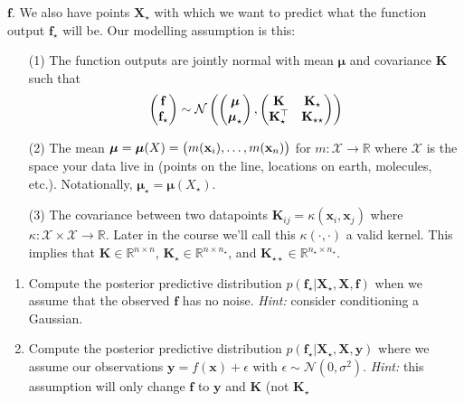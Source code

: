 \documentclass[letter, 12pt]{article}
\begin{document}
\begin{enumerate}
    $\mathbf{f}$. We also have points $\mathbf{X}_\star$ with which we want to predict
    what the function output $\mathbf{f}_\star$ will be. Our modelling assumption is this:
    \begin{enumerate}
        \item[(1)] The function outputs are jointly normal with mean $\boldsymbol{\mu}$ and
            covariance $\mathbf{K}$ such that
            \[
                \left(\begin{matrix}\mathbf{f}\\\mathbf{f}_\star\end{matrix}\right) \sim \mathcal{N}\left(\left(\begin{matrix}\boldsymbol{\mu}\\\boldsymbol{\mu}_\star\end{matrix}\right),\left(\begin{matrix}\mathbf{K}&\mathbf{K}_\star\\\mathbf{K}_\star^\top&\mathbf{K}_{\star\star}\end{matrix}\right)\right)
            \]
        \item[(2)] The mean $\boldsymbol{\mu} = \boldsymbol{\mu}(X) =
            \left(\begin{matrix}m(\mathbf{x}_i),\dots,m(\mathbf{x}_n)\end{matrix}\right)$ for $m : \mathcal{X} \rightarrow
            \mathbb{R}$ where $\mathcal{X}$ is the space your data live in (points on
            the line, locations on earth, molecules, etc.). Notationally,
            $\boldsymbol{\mu}_\star = \boldsymbol{\mu}(X_\star)$.
        \item[(3)] The covariance between two datapoints $\mathbf{K}_{ij} =
            \kappa(\mathbf{x}_i,\mathbf{x}_j)$ where $\kappa : \mathcal{X}\times
            \mathcal{X}\rightarrow \mathbb{R}$. Later in the course we'll call this
            $\kappa(\cdot,\cdot)$ a valid kernel. This implies
            that $\mathbf{K}\in\mathbb{R}^{n\times n}$, $\mathbf{K}_\star\in
            \mathbb{R}^{n\times n_\star}$, and $\mathbf{K}_{\star\star}\in
            \mathbb{R}^{n_\star\times n_\star}$.
    \end{enumerate}
    \begin{enumerate}
        \item Compute the posterior predictive distribution
            $p(\mathbf{f}_\star|\mathbf{X}_\star,\mathbf{X},\mathbf{f})$ when
            we assume that the observed $\mathbf{f}$ has no noise. \textit{Hint:}
            consider conditioning a Gaussian.\vfill
        \item Compute the posterior predictive distribution
            $p(\mathbf{f}_\star|\mathbf{X}_\star,\mathbf{X},\mathbf{y})$ where
            we assume our observations $\mathbf{y} = f(\mathbf{x}) + \epsilon$ with
            $\epsilon
            \sim \mathcal{N}(0,\sigma^2)$. \textit{Hint:} this assumption will only
            change $\mathbf{f}$ to $\mathbf{y}$ and $\mathbf{K}$ (not $\mathbf{K}_\star$

\end{enumerate}
\end{enumerate}
\end{document}
